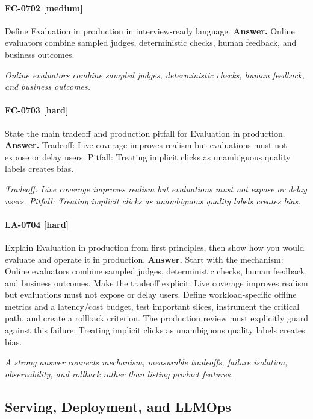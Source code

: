 \paragraph{FC-0702 [medium]} Define Evaluation in production in interview-ready language.
\noindent\textbf{Answer.} Online evaluators combine sampled judges, deterministic checks, human feedback, and business outcomes.
\par\textit{Online evaluators combine sampled judges, deterministic checks, human feedback, and business outcomes.}
\paragraph{FC-0703 [hard]} State the main tradeoff and production pitfall for Evaluation in production.
\noindent\textbf{Answer.} Tradeoff: Live coverage improves realism but evaluations must not expose or delay users. Pitfall: Treating implicit clicks as unambiguous quality labels creates bias.
\par\textit{Tradeoff: Live coverage improves realism but evaluations must not expose or delay users. Pitfall: Treating implicit clicks as unambiguous quality labels creates bias.}
\paragraph{LA-0704 [hard]} Explain Evaluation in production from first principles, then show how you would evaluate and operate it in production.
\noindent\textbf{Answer.} Start with the mechanism: Online evaluators combine sampled judges, deterministic checks, human feedback, and business outcomes. Make the tradeoff explicit: Live coverage improves realism but evaluations must not expose or delay users. Define workload-specific offline metrics and a latency/cost budget, test important slices, instrument the critical path, and create a rollback criterion. The production review must explicitly guard against this failure: Treating implicit clicks as unambiguous quality labels creates bias.
\par\textit{A strong answer connects mechanism, measurable tradeoffs, failure isolation, observability, and rollback rather than listing product features.}
\subsection{Serving, Deployment, and LLMOps}
